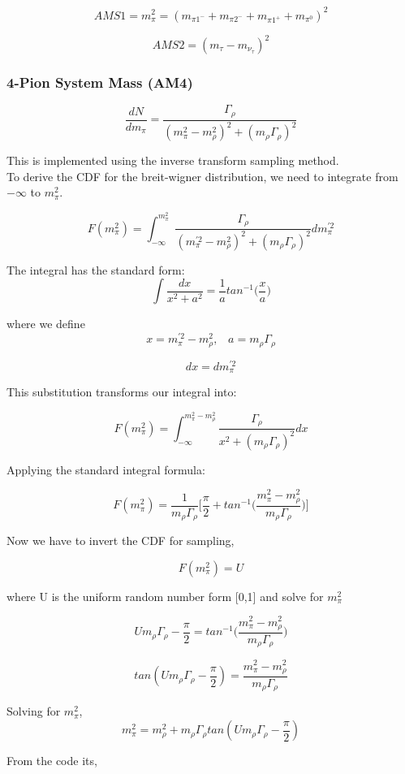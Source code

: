 \documentclass[12pt]{article}
\begin{document}
\[AMS1 = m_\pi^2 = (m_{\pi1^-} + m_{\pi2^-} + m_{\pi1^+} + m_{\pi^0})^2\]

\[AMS2 = (m_\tau - m_{\nu_\tau})^2\]


\subsubsection{4-Pion System Mass (AM4)}

\[\frac{dN}{dm_\pi} = \frac{\Gamma_\rho}{(m_\pi^2 - m_\rho^2)^2 + (m_\rho \Gamma_\rho)^2} \]


This is implemented using the inverse transform sampling method.\\

To derive the CDF for the breit-wigner distribution, we need to integrate from ${-\infty}$ to $m_\pi^2$.

\[F(m_\pi^2) = \int_{-\infty}^{m_\pi^2}  \frac{\Gamma_\rho}{(m_\pi^{'2} - m_\rho^2)^2 + (m_\rho \Gamma_\rho)^2}dm_\pi^{'2} \]

The integral has the standard form:
\[\int \frac{dx}{x^2+a^2} = \frac{1}{a}tan^{-1}\Big(\frac{x}{a}\Big)\]

where we define
\[x = m_\pi^{'2} - m_\rho^2,   \;\;\; a = m_\rho \Gamma_\rho \]

\[dx = dm_\pi^{'2}\]

This substitution transforms our integral into:

\[F(m_\pi^2) = \int_{-\infty}^{m_\pi^2-m_\rho^2}  \frac{\Gamma_\rho}{x^2 + (m_\rho \Gamma_\rho)^2}dx\]

Applying the standard integral formula:

\[F(m_\pi^2) = \frac{1}{m_\rho \Gamma_\rho} \Bigg[ \frac{\pi}{2} + tan^{-1}\Big( \frac{m_\pi^2-m_\rho^2}{m_\rho \Gamma_\rho}\Big) \Bigg]\]

Now we have to invert the CDF for sampling,

\[F(m_\pi^2) = U\]

where U is the uniform random number form [0,1] and solve for $m_\pi^2$

\[Um_\rho \Gamma_\rho - \frac{\pi}{2} = tan^{-1}\Bigg( \frac{m_\pi^2-m_\rho^2}{m_\rho \Gamma_\rho} \Bigg)\]

\[tan (Um_\rho \Gamma_\rho - \frac{\pi}{2}) = \frac{m_\pi^2-m_\rho^2}{m_\rho \Gamma_\rho}\]

Solving for $m_\pi^2$,
\[m_\pi^2 =  m_\rho^2 + m_\rho \Gamma_\rho tan(Um_\rho \Gamma_\rho - \frac{\pi}{2})\]


From the code its,
\end{document}

